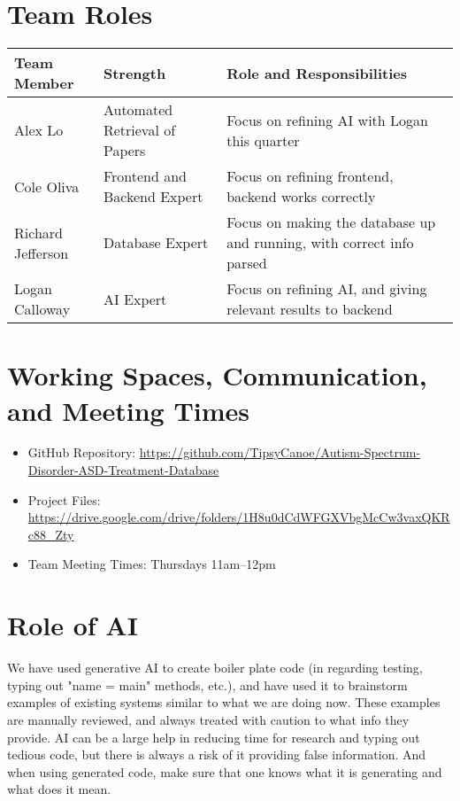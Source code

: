 \documentclass{article}
\begin{document}
\section*{Team Roles}


\begin{tabularx}{\textwidth}{|X|X|X|}
    \hline
    \textbf{Team Member} & \textbf{Strength} & \textbf{Role and Responsibilities} \\
    \hline
    Alex Lo & Automated Retrieval of Papers & Focus on refining AI with Logan this quarter \\
    \hline
    Cole Oliva & Frontend and Backend Expert & Focus on refining frontend, backend works correctly\\
    \hline
    Richard Jefferson & Database Expert & Focus on making the database up and running, with correct info parsed \\
    \hline
    Logan Calloway & AI Expert & Focus on refining AI, and giving relevant results to backend \\
    \hline
\end{tabularx}

\section*{Working Spaces, Communication, and Meeting Times}
\begin{itemize}
    \item GitHub Repository: \url{https://github.com/TipsyCanoe/Autism-Spectrum-Disorder-ASD-Treatment-Database}
    \item Project Files: \url{https://drive.google.com/drive/folders/1H8u0dCdWFGXVbgMcCw3vaxQKRc88_Zty}

    \item Team Meeting Times: Thursdays 11am--12pm

\end{itemize}

\section*{Role of AI}
We have used generative AI to create boiler plate code (in regarding testing, typing out "name = main" methods, etc.), and have used it to brainstorm examples of existing systems similar to what we are doing now. These examples are manually reviewed, and always treated with caution to what info they provide. AI can be a large help in reducing time for research and typing out tedious code, but there is always a risk of it providing false information. And when using generated code, make sure that one knows what it is generating and what does it mean.
\end{document}
